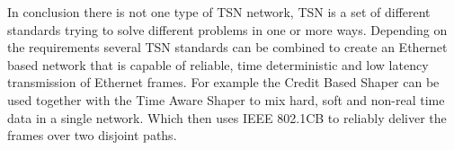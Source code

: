 In conclusion there is not one type of TSN network, TSN is a set of different standards trying to solve different problems in one or more ways. Depending on the requirements several TSN standards can be combined to create an Ethernet based network that is capable of reliable, time deterministic and low latency transmission of Ethernet frames. For example the Credit Based Shaper can be used together with the Time Aware Shaper to mix hard, soft and non-real time data in a single network. Which then uses IEEE 802.1CB to reliably deliver the frames over two disjoint paths.
